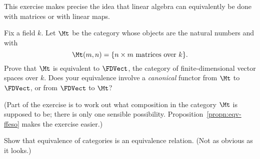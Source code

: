 \begin{question}
This exercise makes precise the idea that linear algebra can equivalently
be done with matrices%
%
%
or with linear maps.

Fix a field $k$.  Let $\Mt$ be the category whose objects are the natural
numbers and with
\[
\Mt(m, n) 
=
\{ n \times m \text{ matrices over } k \}.
\]
Prove that $\Mt$ is equivalent to $\FDVect$, the category of
finite-dimensional vector%
%
%
spaces over $k$.  Does your equivalence involve a \emph{canonical} functor
from $\Mt$ to $\FDVect$, or from $\FDVect$ to $\Mt$?

(Part of the exercise is to work out what composition in the category $\Mt$
is supposed to be; there is only one sensible possibility.
Proposition~\ref{propn:eqv-ffeso} makes the exercise easier.)
\end{question}


\begin{question}        
\label{ex:eqv-eq-reln}
Show that equivalence of categories is an equivalence relation.  (Not as
obvious as it looks.)
\end{question}
